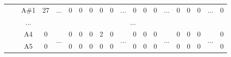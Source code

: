 \documentclass[12pt]{article}
\begin{document}
\begin{table}[!ht]
{\begin{tabular}{clcccccccccccccccccc}
                       & \multicolumn{1}{l|}{} & \multicolumn{1}{c|}{A\#1} & \multicolumn{1}{c|}{27}   & \multicolumn{1}{c|}{...}                  & \multicolumn{1}{c|}{0}    & \multicolumn{1}{c|}{0}    & \multicolumn{1}{c|}{0}    & \multicolumn{1}{c|}{0}    & \multicolumn{1}{c|}{0}  & \multicolumn{1}{c|}{...}                  & \multicolumn{1}{c|}{0}    & \multicolumn{1}{c|}{0}    & \multicolumn{1}{c|}{0}    & \multicolumn{1}{c|}{...}                  & \multicolumn{1}{c|}{0}  & \multicolumn{1}{c|}{0}  & \multicolumn{1}{c|}{0}  & \multicolumn{1}{c|}{...}                  & \multicolumn{1}{c|}{0}  \\ \cline{3-4} \cline{6-10} \cline{12-14} \cline{16-18} \cline{20-20} 
                       & \multicolumn{1}{l|}{} & \multicolumn{1}{c|}{...}  & \multicolumn{17}{c|}{...}                                                                                                                                                                                                                                                                                                                                                                                                                                                                                                                       \\ \cline{3-4} \cline{6-10} \cline{12-14} \cline{16-18} \cline{20-20} 
                       & \multicolumn{1}{l|}{} & \multicolumn{1}{c|}{A4}   & \multicolumn{1}{c|}{0}    & \multicolumn{1}{c|}{\multirow{2}{*}{...}} & \multicolumn{1}{c|}{0}    & \multicolumn{1}{c|}{0}    & \multicolumn{1}{c|}{0}    & \multicolumn{1}{c|}{2}    & \multicolumn{1}{c|}{0}  & \multicolumn{1}{c|}{\multirow{2}{*}{...}} & \multicolumn{1}{c|}{0}    & \multicolumn{1}{c|}{0}    & \multicolumn{1}{c|}{0}    & \multicolumn{1}{c|}{\multirow{2}{*}{...}} & \multicolumn{1}{c|}{0}  & \multicolumn{1}{c|}{0}  & \multicolumn{1}{c|}{0}  & \multicolumn{1}{c|}{\multirow{2}{*}{...}} & \multicolumn{1}{c|}{0}  \\ \cline{3-4} \cline{6-10} \cline{12-14} \cline{16-18} \cline{20-20} 
                       & \multicolumn{1}{l|}{} & \multicolumn{1}{c|}{A5}   & \multicolumn{1}{c|}{0}    & \multicolumn{1}{c|}{}                     & \multicolumn{1}{c|}{0}    & \multicolumn{1}{c|}{0}    & \multicolumn{1}{c|}{0}    & \multicolumn{1}{c|}{0}    & \multicolumn{1}{c|}{0}  & \multicolumn{1}{c|}{}                     & \multicolumn{1}{c|}{0}    & \multicolumn{1}{c|}{0}    & \multicolumn{1}{c|}{0}    & \multicolumn{1}{c|}{}                     & \multicolumn{1}{c|}{0}  & \multicolumn{1}{c|}{0}  & \multicolumn{1}{c|}{0}  & \multicolumn{1}{c|}{}                     & \multicolumn{1}{c|}{0}  \\ \cline{3-4} \cline{6-10} \cline{12-14} \cline{16-18} \cline{20-20} 

\end{tabular}}
\end{table}
\end{document}

